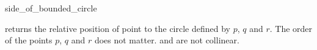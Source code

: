\begin{ccRefFunction}{side_of_bounded_circle}

         {returns the relative position of point 
          to the circle defined by $p$, $q$ and $r$. The order
          of the points $p$, $q$ and $r$ does not matter.
          \ccPrecond {} and  are not collinear.}
\end{ccRefFunction}


